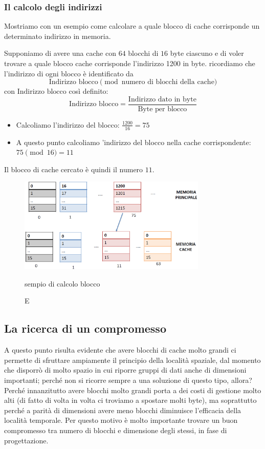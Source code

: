\documentclass[class=book, crop=false, oneside]{standalone}
\begin{document}
\subsubsection{Il calcolo degli indirizzi}
Mostriamo con un esempio come calcolare a quale blocco di cache corrisponde un determinato indirizzo in memoria.

Supponiamo di avere una cache con \(64\) blocchi di \(16\) byte ciascuno e di voler trovare a quale blocco cache corrisponde l'indirizzo 1200 in byte. ricordiamo che l'indirizzo di ogni blocco è identificato da
\begin{equation*}
  \textrm{Indirizzo blocco}\pmod{\textrm{numero di blocchi della cache}}
\end{equation*}
con \(\textrm{Indirizzo blocco}\) così definito:
\begin{equation*}
  \textrm{Indirizzo blocco}=\frac{\textrm{Indirizzo dato in byte}}{\textrm{Byte per blocco}}
\end{equation*}
\begin{itemize}
  \item Calcoliamo l'indirizzo del blocco: \(\frac{1200}{16}=75\)
  \item A questo punto calcoliamo 'indirizzo del blocco nella cache corrispondente: \(75\pmod{16}=11\)
\end{itemize}
Il blocco di cache cercato è quindi il numero \(11\).
\begin{figure}[H]
  \centering
  \includegraphics[width=0.8\textwidth,keepaspectratio]{addressex.png}
  \caption Esempio di calcolo blocco
\end{figure}

\subsection{La ricerca di un compromesso}
A questo punto risulta evidente che avere blocchi di cache molto grandi ci permette di sfruttare ampiamente il principio della località spaziale, dal momento che disporrò di molto spazio in cui riporre gruppi di dati anche di dimensioni importanti; perché non si ricorre sempre a una soluzione di questo tipo, allora? Perché innanzitutto avere blocchi molto grandi porta a dei costi di gestione molto alti (di fatto di volta in volta ci troviamo a spostare molti byte), ma soprattutto perché a parità di dimensioni avere meno blocchi diminuisce l'efficacia della località temporale. Per questo motivo è molto importante trovare un buon compromesso tra numero di blocchi e dimensione degli stessi, in fase di progettazione.
\end{document}
